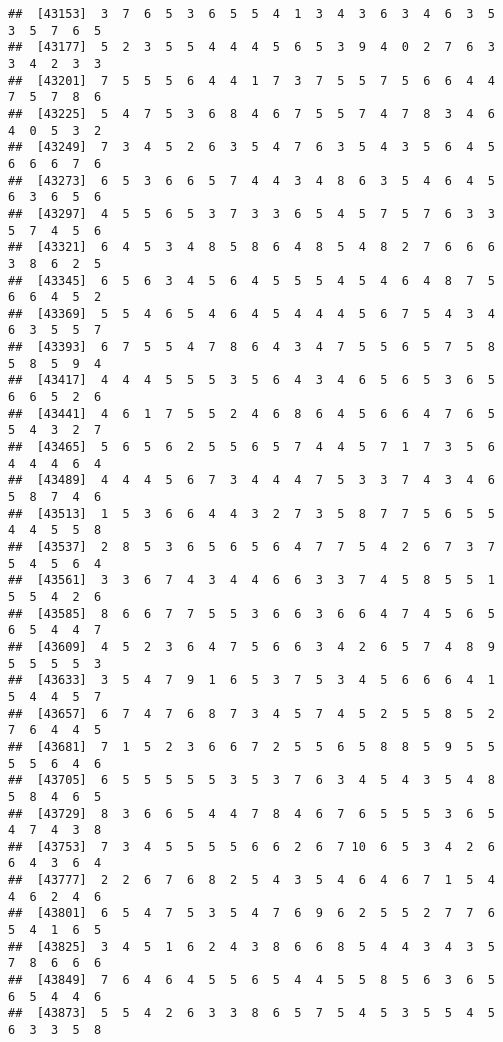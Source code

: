 \documentclass[
]{book}
\begin{document}
\begin{verbatim}
##  [43153]  3  7  6  5  3  6  5  5  4  1  3  4  3  6  3  4  6  3  5  3  5  7  6  5
##  [43177]  5  2  3  5  5  4  4  4  5  6  5  3  9  4  0  2  7  6  3  3  4  2  3  3
##  [43201]  7  5  5  5  6  4  4  1  7  3  7  5  5  7  5  6  6  4  4  7  5  7  8  6
##  [43225]  5  4  7  5  3  6  8  4  6  7  5  5  7  4  7  8  3  4  6  4  0  5  3  2
##  [43249]  7  3  4  5  2  6  3  5  4  7  6  3  5  4  3  5  6  4  5  6  6  6  7  6
##  [43273]  6  5  3  6  6  5  7  4  4  3  4  8  6  3  5  4  6  4  5  6  3  6  5  6
##  [43297]  4  5  5  6  5  3  7  3  3  6  5  4  5  7  5  7  6  3  3  5  7  4  5  6
##  [43321]  6  4  5  3  4  8  5  8  6  4  8  5  4  8  2  7  6  6  6  3  8  6  2  5
##  [43345]  6  5  6  3  4  5  6  4  5  5  5  4  5  4  6  4  8  7  5  6  6  4  5  2
##  [43369]  5  5  4  6  5  4  6  4  5  4  4  4  5  6  7  5  4  3  4  6  3  5  5  7
##  [43393]  6  7  5  5  4  7  8  6  4  3  4  7  5  5  6  5  7  5  8  5  8  5  9  4
##  [43417]  4  4  4  5  5  5  3  5  6  4  3  4  6  5  6  5  3  6  5  6  6  5  2  6
##  [43441]  4  6  1  7  5  5  2  4  6  8  6  4  5  6  6  4  7  6  5  5  4  3  2  7
##  [43465]  5  6  5  6  2  5  5  6  5  7  4  4  5  7  1  7  3  5  6  4  4  4  6  4
##  [43489]  4  4  4  5  6  7  3  4  4  4  7  5  3  3  7  4  3  4  6  5  8  7  4  6
##  [43513]  1  5  3  6  6  4  4  3  2  7  3  5  8  7  7  5  6  5  5  4  4  5  5  8
##  [43537]  2  8  5  3  6  5  6  5  6  4  7  7  5  4  2  6  7  3  7  5  4  5  6  4
##  [43561]  3  3  6  7  4  3  4  4  6  6  3  3  7  4  5  8  5  5  1  5  5  4  2  6
##  [43585]  8  6  6  7  7  5  5  3  6  6  3  6  6  4  7  4  5  6  5  6  5  4  4  7
##  [43609]  4  5  2  3  6  4  7  5  6  6  3  4  2  6  5  7  4  8  9  5  5  5  5  3
##  [43633]  3  5  4  7  9  1  6  5  3  7  5  3  4  5  6  6  6  4  1  5  4  4  5  7
##  [43657]  6  7  4  7  6  8  7  3  4  5  7  4  5  2  5  5  8  5  2  7  6  4  4  5
##  [43681]  7  1  5  2  3  6  6  7  2  5  5  6  5  8  8  5  9  5  5  5  5  6  4  6
##  [43705]  6  5  5  5  5  5  3  5  3  7  6  3  4  5  4  3  5  4  8  5  8  4  6  5
##  [43729]  8  3  6  6  5  4  4  7  8  4  6  7  6  5  5  5  3  6  5  4  7  4  3  8
##  [43753]  7  3  4  5  5  5  5  6  6  2  6  7 10  6  5  3  4  2  6  6  4  3  6  4
##  [43777]  2  2  6  7  6  8  2  5  4  3  5  4  6  4  6  7  1  5  4  4  6  2  4  6
##  [43801]  6  5  4  7  5  3  5  4  7  6  9  6  2  5  5  2  7  7  6  5  4  1  6  5
##  [43825]  3  4  5  1  6  2  4  3  8  6  6  8  5  4  4  3  4  3  5  7  8  6  6  6
##  [43849]  7  6  4  6  4  5  5  6  5  4  4  5  5  8  5  6  3  6  5  6  5  4  4  6
##  [43873]  5  5  4  2  6  3  3  8  6  5  7  5  4  5  3  5  5  4  5  6  3  3  5  8

\end{verbatim}
\end{document}
